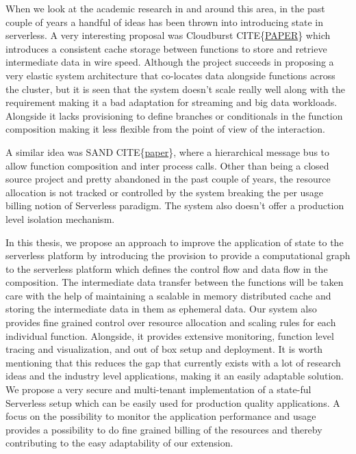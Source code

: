 \documentclass[12pt,titlepage]{article}
\begin{document}
When we look at the academic research in and around this area, in the past
couple of years a handful of ideas has been thrown into introducing state in
serverless. A very interesting proposal was Cloudburst CITE\{\href{https://arxiv.org/abs/2001.04592}{PAPER}\} which
introduces a consistent cache storage between functions to store and retrieve
intermediate data in wire speed. Although the project succeeds in proposing a
very elastic system architecture that co-locates data alongside functions across
the cluster, but it is seen that the system doesn't scale really well along with
the requirement making it a bad adaptation for streaming and big data workloads.
Alongside it lacks provisioning to define branches or conditionals in the function
composition making it less flexible from the point of view of the interaction.

A similar idea was SAND CITE\{\href{https://www.usenix.org/system/files/conference/atc18/atc18-akkus.pdf}{paper}\}, where a hierarchical message bus to allow
function composition and inter process calls. Other than being a closed source
project and pretty abandoned in the past couple of years, the resource
allocation is not tracked or controlled by the system breaking the per usage
billing notion of Serverless paradigm. The system also doesn't offer a
production level isolation mechanism.

In this thesis, we propose an approach to improve the application of state
to the serverless platform by introducing the provision to provide a
computational graph to the serverless platform which defines the control flow
and data flow in the composition. The intermediate data transfer between the
functions will be taken care with the help of maintaining a scalable in memory
distributed cache and storing the intermediate data in them as ephemeral data.
Our system also provides fine grained control over resource allocation and
scaling rules for each individual function. Alongside, it provides extensive
monitoring, function level tracing and visualization, and out of box setup and
deployment. It is worth mentioning  that this  reduces the gap that currently
exists with a lot of research ideas and the industry level applications, making
it an easily adaptable solution. We propose a very secure and multi-tenant implementation of a
state-ful Serverless setup which can be easily used for production quality
applications. A focus on the possibility to monitor the application performance
and usage provides a possibility to do fine grained billing of the resources and thereby
contributing to the easy adaptability of our extension.
\end{document}
